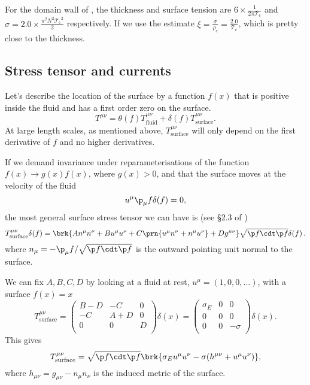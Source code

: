 \documentclass[12pt]{article}
\newcommand{\tc}{\mathcal{T_\mathrm{c}}}
\newcommand{\rc}{\rho_\mathrm{c}}
\newcommand{\surf}{_\text{surface}}
\begin{document}
For the domain wall of \cite{Aharony:2005bm}, the thickness and surface tension are $6\times \frac{1}{2\pi \tc}$ and $\sigma=2.0 \times \frac{\pi^2 N^2 \tc^2}{2}$ respectively. If we use the estimate $\xi = \frac{\sigma}{\rc} = \frac{2.0}{\tc}$, which is pretty close to the thickness.

\subsection{Stress tensor and currents}\label{sec:surfstr}

Let's describe the location of the surface by a function $f(x)$ that is positive inside the fluid and has a first order zero on the surface.
%
\begin{equation}\label{fluidsurf:eq}
  T^{\mu\nu} = \theta(f)T^{\mu\nu}_\text{fluid} + \delta(f)T^{\mu\nu}_\text{surface}.
\end{equation}
%
At large length scales, as mentioned above, $T^{\mu\nu}_\text{surface}$ will only depend on the first derivative of $f$ and no higher derivatives.

If we demand invariance under reparameterisations of the function $f(x) \to g(x)f(x)$, where $g(x) > 0$, and that the surface moves at the velocity of the fluid
%
\begin{equation}\label{surfvel:eq}
  u^\mu \p_\mu f \delta(f) =0,
\end{equation}
%
the most general surface stress tensor we can have is (see \S2.3 of \cite{Lahiri:2007ae})
%
\begin{equation*}
    T^{\mu\nu}\surf\delta(f) = \brk{A n^\mu n^\nu
                   +B u^\mu u^\nu
                   +C \prn{u^\mu n^\nu + n^\mu u^\nu}
                   +D g^{\mu\nu}}\sqrt{\p f\cdt\p f}\delta(f)\,.
\end{equation*}
%
%
where $n_\mu = -\p_\mu f / \sqrt{\p f \cdt \p f}$ is the outward pointing unit normal to the surface.

We can fix $A,B,C,D$ by looking at a fluid at rest, $u^\mu = (1,0,0,\ldots)$, with a surface $f(x)=x$
%
\begin{equation*}
  T^{\mu\nu}\surf =
  \begin{pmatrix}
    B-D & -C   & 0  \\
    -C   & A+D & 0  \\
    0   & 0   & D  \\
  \end{pmatrix}
     \delta(x)=
  \begin{pmatrix}
    \sigma_E & 0 &  0   \\
    0 & 0 &  0   \\
    0 & 0 & -\sigma   \\
  \end{pmatrix}
     \delta(x).
\end{equation*}
%
This gives
%
\begin{equation}\label{surfstressgen:eq}
  T^{\mu\nu}\surf = \sqrt{\p f \cdt \p f} \brk{\sigma_E u^\mu u^\nu -\sigma(h^{\mu\nu} + u^\mu u^\nu)},
\end{equation}
%
where $h_{\mu\nu} = g_{\mu\nu} - n_\mu n_\nu$ is the induced metric of the surface.
\end{document}
